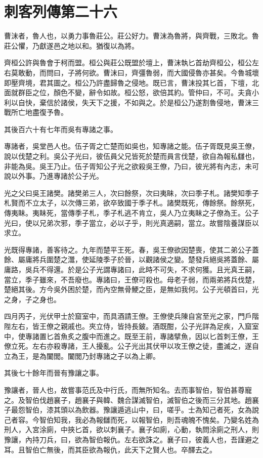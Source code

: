 \chapter{刺客列傳第二十六}

曹沫者，魯人也，以勇力事魯莊公。莊公好力。曹沫為魯將，與齊戰，三敗北。魯莊公懼，乃獻遂邑之地以和。猶復以為將。

齊桓公許與魯會于柯而盟。桓公與莊公既盟於壇上，曹沫執匕首劫齊桓公，桓公左右莫敢動，而問曰，子將何欲。曹沫曰，齊彊魯弱，而大國侵魯亦甚矣。今魯城壞即壓齊境，君其圖之。桓公乃許盡歸魯之侵地。既已言，曹沫投其匕首，下壇，北面就群臣之位，顏色不變，辭令如故。桓公怒，欲倍其約。管仲曰，不可。夫貪小利以自快，棄信於諸侯，失天下之援，不如與之。於是桓公乃遂割魯侵地，曹沫三戰所亡地盡復予魯。

其後百六十有七年而吳有專諸之事。

專諸者，吳堂邑人也。伍子胥之亡楚而如吳也，知專諸之能。伍子胥既見吳王僚，說以伐楚之利。吳公子光曰，彼伍員父兄皆死於楚而員言伐楚，欲自為報私讎也，非能為吳。吳王乃止。伍子胥知公子光之欲殺吳王僚，乃曰，彼光將有內志，未可說以外事。乃進專諸於公子光。

光之父曰吳王諸樊。諸樊弟三人，次曰餘祭，次曰夷眛，次曰季子札。諸樊知季子札賢而不立太子，以次傳三弟，欲卒致國于季子札。諸樊既死，傳餘祭。餘祭死，傳夷眛。夷眛死，當傳季子札，季子札逃不肯立，吳人乃立夷眛之子僚為王。公子光曰，使以兄弟次邪，季子當立，必以子乎，則光真適嗣，當立。故嘗陰養謀臣以求立。

光既得專諸，善客待之。九年而楚平王死。春，吳王僚欲因楚喪，使其二弟公子蓋餘、屬庸將兵圍楚之灊，使延陵季子於晉，以觀諸侯之變。楚發兵絕吳將蓋餘、屬庸路，吳兵不得還。於是公子光謂專諸曰，此時不可失，不求何獲。且光真王嗣，當立，季子雖來，不吾廢也。專諸曰，王僚可殺也。母老子弱，而兩弟將兵伐楚，楚絕其後。方今吳外困於楚，而內空無骨鯁之臣，是無如我何。公子光頓首曰，光之身，子之身也。

四月丙子，光伏甲士於窟室中，而具酒請王僚。王僚使兵陳自宮至光之家，門戶階陛左右，皆王僚之親戚也。夾立侍，皆持長鈹。酒既酣，公子光詳為足疾，入窟室中，使專諸置匕首魚炙之腹中而進之。既至王前，專諸擘魚，因以匕首刺王僚，王僚立死。左右亦殺專諸，王人擾亂。公子光出其伏甲以攻王僚之徒，盡滅之，遂自立為王，是為闔閭。闔閭乃封專諸之子以為上卿。

其後七十餘年而晉有豫讓之事。

豫讓者，晉人也，故嘗事范氏及中行氏，而無所知名。去而事智伯，智伯甚尊寵之。及智伯伐趙襄子，趙襄子與韓、魏合謀滅智伯，滅智伯之後而三分其地。趙襄子最怨智伯，漆其頭以為飲器。豫讓遁逃山中，曰，嗟乎。士為知己者死，女為說己者容。今智伯知我，我必為報讎而死，以報智伯，則吾魂魄不愧矣。乃變名姓為刑人，入宮涂廁，中挾匕首，欲以刺襄子。襄子如廁，心動，執問涂廁之刑人，則豫讓，內持刀兵，曰，欲為智伯報仇。左右欲誅之。襄子曰，彼義人也，吾謹避之耳。且智伯亡無後，而其臣欲為報仇，此天下之賢人也。卒醳去之。

